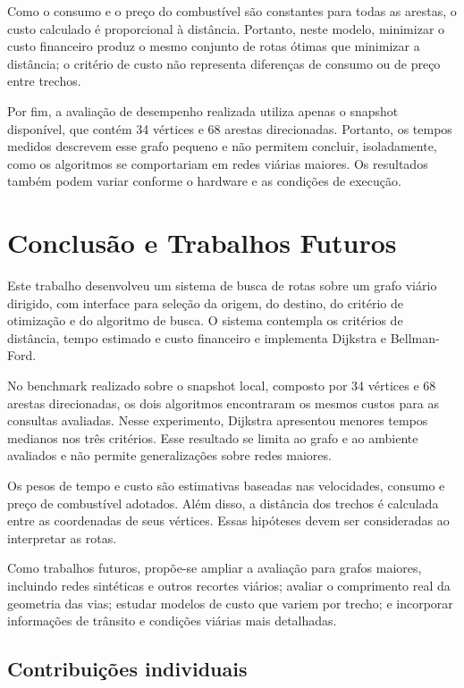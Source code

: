 \documentclass[12pt]{article}
\begin{document}
Como o consumo e o preço do combustível são constantes para todas as arestas, o custo calculado é proporcional à distância. Portanto, neste modelo, minimizar o custo financeiro produz o mesmo conjunto de rotas ótimas que minimizar a distância; o critério de custo não representa diferenças de consumo ou de preço entre trechos.

Por fim, a avaliação de desempenho realizada utiliza apenas o snapshot disponível, que contém 34 vértices e 68 arestas direcionadas. Portanto, os tempos medidos descrevem esse grafo pequeno e não permitem concluir, isoladamente, como os algoritmos se comportariam em redes viárias maiores. Os resultados também podem variar conforme o hardware e as condições de execução.

\section{Conclusão e Trabalhos Futuros}
\label{sec:conclusao}

Este trabalho desenvolveu um sistema de busca de rotas sobre um grafo
viário dirigido, com interface para seleção da origem, do destino, do
critério de otimização e do algoritmo de busca. O sistema contempla os
critérios de distância, tempo estimado e custo financeiro e implementa
Dijkstra e Bellman-Ford.

No benchmark realizado sobre o snapshot local, composto por 34 vértices
e 68 arestas direcionadas, os dois algoritmos encontraram os mesmos
custos para as consultas avaliadas. Nesse experimento, Dijkstra apresentou
menores tempos medianos nos três critérios. Esse resultado se limita ao
grafo e ao ambiente avaliados e não permite generalizações sobre redes
maiores.

Os pesos de tempo e custo são estimativas baseadas nas velocidades,
consumo e preço de combustível adotados. Além disso, a distância dos
trechos é calculada entre as coordenadas de seus vértices. Essas hipóteses
devem ser consideradas ao interpretar as rotas.

Como trabalhos futuros, propõe-se ampliar a avaliação para grafos maiores,
incluindo redes sintéticas e outros recortes viários; avaliar o comprimento
real da geometria das vias; estudar modelos de custo que variem por trecho;
e incorporar informações de trânsito e condições viárias mais detalhadas.

\subsection{Contribuições individuais}
\end{document}

